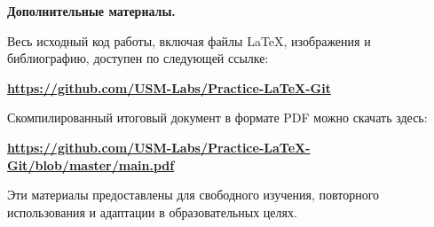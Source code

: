 \documentclass[a4paper,12pt]{report}
\newcommand{\github}{\url{https://github.com/USM-Labs/Practice-LaTeX-Git}}
\newcommand{\pdfLink}{\url{https://github.com/USM-Labs/Practice-LaTeX-Git/blob/master/main.pdf}}
\begin{document}
\textbf{Дополнительные материалы.}

Весь исходный код работы, включая файлы \LaTeX{}, изображения и библиографию, доступен по следующей ссылке:
\begin{center}
\textbf{\github}
\end{center}

Скомпилированный итоговый документ в формате PDF можно скачать здесь:
\begin{center}
\textbf{\pdfLink}
\end{center}

\noindent Эти материалы предоставлены для свободного изучения, повторного использования и адаптации в образовательных целях.


\bibliographyChapter %

\end{document}
